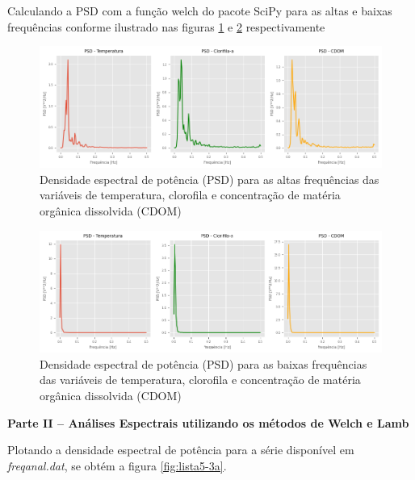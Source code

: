 \documentclass[12pt,a4paper,portuguese]{article}
\begin{document}
Calculando a PSD com a função welch do pacote SciPy para as altas e baixas frequências conforme ilustrado nas figuras \ref{fig:lista5-2c} e \ref{fig:lista5-2d} respectivamente
	\begin{figure}[H]
		\centering
		\includegraphics[width=1\linewidth]{lista5-2c}
		\caption{Densidade espectral de potência (PSD) para as altas frequências das variáveis de temperatura, clorofila e concentração de matéria orgânica dissolvida (CDOM) }
		\label{fig:lista5-2c}
	\end{figure}
		\begin{figure}[H]
		\centering
		\includegraphics[width=1\linewidth]{lista5-2d}
		\caption{Densidade espectral de potência (PSD) para as baixas frequências das variáveis de temperatura, clorofila e concentração de matéria orgânica dissolvida (CDOM) }
		\label{fig:lista5-2d}
	\end{figure}
	
\textbf{Parte II – Análises Espectrais utilizando os métodos de Welch e Lamb}

Plotando a densidade espectral de potência para a série disponível em \textit{freqanal.dat}, se obtém a figura \ref{fig:lista5-3a}.
\end{document}
